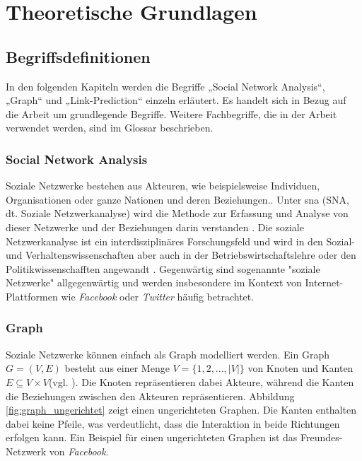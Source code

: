 \chapter{Theoretische Grundlagen}

\section{Begriffsdefinitionen}
In den folgenden Kapiteln werden die Begriffe „Social Network Analysis“, „Graph“ und „Link-Prediction“ einzeln
erläutert. Es handelt sich in Bezug auf die Arbeit um grundlegende Begriffe. Weitere Fachbegriffe, die
in der Arbeit verwendet werden, sind im Glossar beschrieben.

\subsection{Social Network Analysis}
Soziale Netzwerke bestehen aus Akteuren, wie beispielsweise Individuen, Organisationen oder ganze Nationen und deren Beziehungen.\cite{noauthor_soziale_nodate}.
Unter \acl{sna} (SNA, dt. Soziale Netzwerkanalyse) wird die Methode zur Erfassung und Analyse von dieser Netzwerke und der Beziehungen darin verstanden \cite{noauthor_soziale_2019}.
Die soziale Netzwerkanalyse ist ein interdisziplinäres Forschungsfeld und wird in den Sozial- und Verhaltenswissenschaften aber auch in der Betriebswirtschaftslehre oder den Politikwissenschafften angewandt \cite{noauthor_soziale_nodate}.
Gegenwärtig sind sogenannte "soziale Netzwerke" allgegenwärtig und werden insbesondere im Kontext von Internet-Plattformen wie \textit{Facebook} oder \textit{Twitter} häufig betrachtet.

\subsection{Graph}
Soziale Netzwerke können einfach als Graph modelliert werden.
Ein Graph $G = (V, E)$ besteht aus einer Menge $V = \{1,2,...,|V|\}$ von Knoten und Kanten $E \subseteq V\times V $(vgl. \cite{ottmann_algorithmen_2017}).
Die Knoten repräsentieren dabei Akteure, während die Kanten die Beziehungen zwischen den Akteuren repräsentieren.
Abbildung \ref{fig:graph_ungerichtet} zeigt einen ungerichteten Graphen. Die Kanten enthalten dabei keine Pfeile, was verdeutlicht, dass die Interaktion in beide Richtungen erfolgen kann.
Ein Beispiel für einen ungerichteten Graphen ist das Freundes-Netzwerk von \textit{Facebook}.


